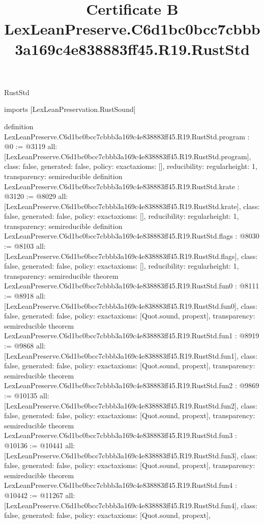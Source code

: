 \begin{lexlean}{RustStd}
\title{Certificate B LexLeanPreserve.C6d1bc0bcc7cbbb3a169c4e838883ff45.R19.RustStd}
\begin{coremodule}
imports [LexLeanPreservation.RustSound]

definition LexLeanPreserve.C6d1bc0bcc7cbbb3a169c4e838883ff45.R19.RustStd.program : @0 := @3119 {
  all: [LexLeanPreserve.C6d1bc0bcc7cbbb3a169c4e838883ff45.R19.RustStd.program],
  class: false,
  generated: false,
  policy: exact{axioms: []},
  reducibility: regular{height: 1},
  transparency: semireducible
}
definition LexLeanPreserve.C6d1bc0bcc7cbbb3a169c4e838883ff45.R19.RustStd.krate : @3120 := @8029 {
  all: [LexLeanPreserve.C6d1bc0bcc7cbbb3a169c4e838883ff45.R19.RustStd.krate],
  class: false,
  generated: false,
  policy: exact{axioms: []},
  reducibility: regular{height: 1},
  transparency: semireducible
}
definition LexLeanPreserve.C6d1bc0bcc7cbbb3a169c4e838883ff45.R19.RustStd.flags : @8030 := @8103 {
  all: [LexLeanPreserve.C6d1bc0bcc7cbbb3a169c4e838883ff45.R19.RustStd.flags],
  class: false,
  generated: false,
  policy: exact{axioms: []},
  reducibility: regular{height: 1},
  transparency: semireducible
}
theorem LexLeanPreserve.C6d1bc0bcc7cbbb3a169c4e838883ff45.R19.RustStd.fun0 : @8111 := @8918 {
  all: [LexLeanPreserve.C6d1bc0bcc7cbbb3a169c4e838883ff45.R19.RustStd.fun0],
  class: false,
  generated: false,
  policy: exact{axioms: [Quot.sound, propext]},
  transparency: semireducible
}
theorem LexLeanPreserve.C6d1bc0bcc7cbbb3a169c4e838883ff45.R19.RustStd.fun1 : @8919 := @9868 {
  all: [LexLeanPreserve.C6d1bc0bcc7cbbb3a169c4e838883ff45.R19.RustStd.fun1],
  class: false,
  generated: false,
  policy: exact{axioms: [Quot.sound, propext]},
  transparency: semireducible
}
theorem LexLeanPreserve.C6d1bc0bcc7cbbb3a169c4e838883ff45.R19.RustStd.fun2 : @9869 := @10135 {
  all: [LexLeanPreserve.C6d1bc0bcc7cbbb3a169c4e838883ff45.R19.RustStd.fun2],
  class: false,
  generated: false,
  policy: exact{axioms: [Quot.sound, propext]},
  transparency: semireducible
}
theorem LexLeanPreserve.C6d1bc0bcc7cbbb3a169c4e838883ff45.R19.RustStd.fun3 : @10136 := @10441 {
  all: [LexLeanPreserve.C6d1bc0bcc7cbbb3a169c4e838883ff45.R19.RustStd.fun3],
  class: false,
  generated: false,
  policy: exact{axioms: [Quot.sound, propext]},
  transparency: semireducible
}
theorem LexLeanPreserve.C6d1bc0bcc7cbbb3a169c4e838883ff45.R19.RustStd.fun4 : @10442 := @11267 {
  all: [LexLeanPreserve.C6d1bc0bcc7cbbb3a169c4e838883ff45.R19.RustStd.fun4],
  class: false,
  generated: false,
  policy: exact{axioms: [Quot.sound, propext]},
}
\end{coremodule}
\end{lexlean}
